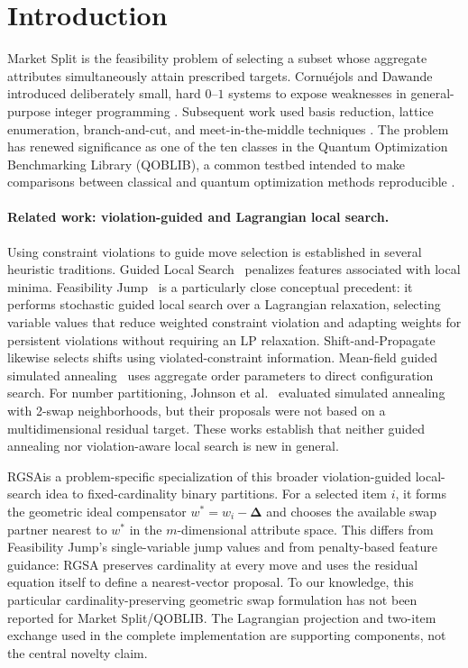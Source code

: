 \documentclass[11pt]{article}
\newcommand{\res}{\boldsymbol{\Delta}}
\newcommand{\RGSA}{\textsc{RGSA}}
\begin{document}
\section{Introduction}\label{sec:introduction}
Market Split is the feasibility problem of selecting a subset whose aggregate attributes simultaneously attain prescribed targets. Cornu\'ejols and Dawande introduced deliberately small, hard $0$--$1$ systems to expose weaknesses in general-purpose integer programming \cite{cornuejols1998}. Subsequent work used basis reduction, lattice enumeration, branch-and-cut, and meet-in-the-middle techniques \cite{aardal1999,aardal2000,wassermann2002,wassermann2021,wassermann2026,kempkekoch2026}. The problem has renewed significance as one of the ten classes in the Quantum Optimization Benchmarking Library (QOBLIB), a common testbed intended to make comparisons between classical and quantum optimization methods reproducible \cite{koch2025}.

\paragraph{Related work: violation-guided and Lagrangian local search.}
Using constraint violations to guide move selection is established in several heuristic traditions. Guided Local Search~\cite{gls1999} penalizes features associated with local minima. Feasibility Jump~\cite{fj2023} is a particularly close conceptual precedent: it performs stochastic guided local search over a Lagrangian relaxation, selecting variable values that reduce weighted constraint violation and adapting weights for persistent violations without requiring an LP relaxation. Shift-and-Propagate~\cite{berthold2015} likewise selects shifts using violated-constraint information. Mean-field guided simulated annealing~\cite{isakov2003} uses aggregate order parameters to direct configuration search. For number partitioning, Johnson et al.~\cite{johnson1991} evaluated simulated annealing with 2-swap neighborhoods, but their proposals were not based on a multidimensional residual target. These works establish that neither guided annealing nor violation-aware local search is new in general.

\RGSA is a problem-specific specialization of this broader violation-guided local-search idea to fixed-cardinality binary partitions. For a selected item $i$, it forms the geometric ideal compensator $w^*=w_i-\res$ and chooses the available swap partner nearest to $w^*$ in the $m$-dimensional attribute space. This differs from Feasibility Jump's single-variable jump values and from penalty-based feature guidance: RGSA preserves cardinality at every move and uses the residual equation itself to define a nearest-vector proposal. To our knowledge, this particular cardinality-preserving geometric swap formulation has not been reported for Market Split/QOBLIB. The Lagrangian projection and two-item exchange used in the complete implementation are supporting components, not the central novelty claim.
\end{document}
